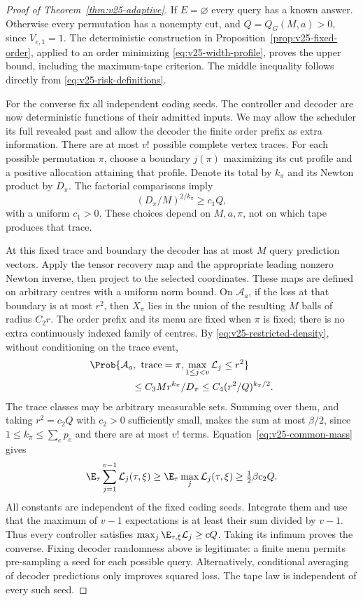 \begin{proof}[Proof of Theorem~\ref{thm:v25-adaptive}]
If $E=\varnothing$ every query has a known answer. Otherwise every
permutation has a nonempty cut, and $Q=Q_G(M,a)>0$, since
$V_{e,1}=1$. The deterministic construction in
Proposition~\ref{prop:v25-fixed-order}, applied to an order minimizing
\eqref{eq:v25-width-profile}, proves the upper bound, including the
maximum-tape criterion. The middle inequality follows directly from
\eqref{eq:v25-risk-definitions}.

For the converse fix all independent coding seeds. The controller and
decoder are now deterministic functions of their admitted inputs. We
may allow the scheduler its full revealed past and allow the decoder
the finite order prefix as extra information. There are at most $v!$
possible complete vertex traces. For each possible permutation $\pi$,
choose a boundary $j(\pi)$ maximizing its cut profile and a positive
allocation attaining that profile. Denote its total by $k_\pi$ and
its Newton product by $D_\pi$. The factorial comparisons imply
\begin{equation}\label{eq:v25-bottleneck-volume}
 (D_\pi/M)^{2/k_\pi}\ge c_1 Q,
\end{equation}
with a uniform $c_1>0$. These choices depend on $M,a,\pi$, not on
which tape produces that trace.

At this fixed trace and boundary the decoder has at most $M$ query
prediction vectors. Apply the tensor recovery map and the appropriate
leading nonzero Newton inverse, then project to the selected coordinates.
These maps are defined on arbitrary centres with a uniform norm bound.
On $\mathcal A_a$, if the loss at that boundary is at most $r^2$,
then $X_\pi$ lies in the union of the resulting $M$ balls of radius
$C_2r$. The order prefix and its menu are fixed when $\pi$ is fixed;
there is no extra continuously indexed family of centres.
By \eqref{eq:v25-restricted-density}, without conditioning on the
trace event,
\[
 \begin{split}
 &\Prob\{\mathcal A_a,\ \text{trace}=\pi,
                       \max_{1\le j<v}\mathcal L_j\le r^2\}\\
 &\hspace{15mm}\le C_3 M r^{k_\pi}/D_\pi
               \le C_4(r^2/Q)^{k_\pi/2}.
 \end{split}
\]
The trace classes may be arbitrary measurable sets. Summing over them,
and taking $r^2=c_2Q$ with $c_2>0$ sufficiently small, makes the sum
at most $\beta/2$, since $1\le k_\pi\le\sum_ep_e$ and there are
at most $v!$ terms. Equation~\eqref{eq:v25-common-mass} gives
\[
 \E_\tau\sum_{j=1}^{v-1}\mathcal L_j(\tau,\xi)
 \ge \E_\tau\max_j\mathcal L_j(\tau,\xi)
 \ge \tfrac12\beta c_2 Q.
\]
All constants are independent of the fixed coding seeds. Integrate them
and use that the maximum of $v-1$ expectations is at least their sum
divided by $v-1$. Thus every controller satisfies
$\max_j\E_{\tau,\xi}\mathcal L_j\ge cQ$. Taking its infimum proves
the converse. Fixing decoder randomness above is legitimate: a finite
menu permits pre-sampling a seed for each possible query. Alternatively,
conditional averaging of decoder predictions only improves squared loss.
The tape law is independent of every such seed.


\end{proof}
